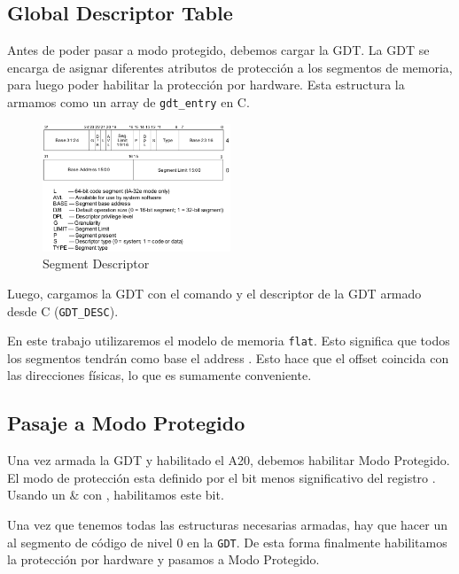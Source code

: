 \subsection{Global Descriptor Table}
Antes de poder pasar a modo protegido, debemos cargar la GDT. La GDT se encarga de asignar diferentes atributos de protección a los segmentos de memoria, para luego poder habilitar la protección por hardware. Esta estructura la armamos como un array de \texttt{gdt\_entry} en C.

\begin{figure}[h!]
  \centering
    \includegraphics[width=0.5\textwidth]{images/segment_descriptor}
  \caption{Segment Descriptor}
\end{figure}

Luego, cargamos la GDT con el comando  y el descriptor de la GDT armado desde C (\texttt{GDT\_DESC}).

En este trabajo utilizaremos el modelo de memoria \texttt{flat}. Esto significa que todos los segmentos tendrán como base el address . Esto hace que el offset coincida con las direcciones físicas, lo que es sumamente conveniente. %

\subsection{Pasaje a Modo Protegido}
Una vez armada la GDT y habilitado el A20, debemos habilitar Modo Protegido. El modo de protección esta definido por el bit menos significativo del registro . Usando un \& con , habilitamos este bit.

Una vez que tenemos todas las estructuras necesarias armadas, hay que hacer un  al segmento de código de nivel 0 en la \texttt{GDT}. De esta forma finalmente habilitamos la protección por hardware y pasamos a Modo Protegido. 

